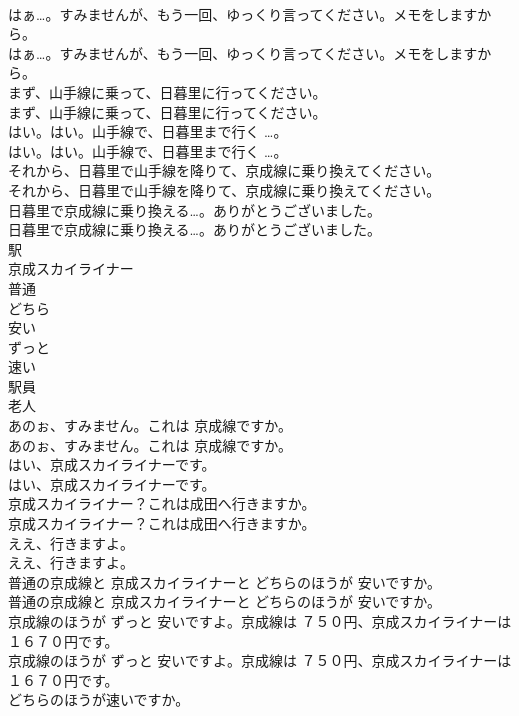 \documentclass[8pt]{extreport}
\begin{document}
\begin{CJK}{UTF8}{min}
\\	はぁ…。すみませんが、もう一回、ゆっくり言ってください。メモをしますから。	
\\	はぁ…。すみませんが、もう一回、ゆっくり言ってください。メモをしますから。 
\\	まず、山手線に乗って、日暮里に行ってください。	
\\	まず、山手線に乗って、日暮里に行ってください。 
\\	はい。はい。山手線で、日暮里まで行く …。	
\\	はい。はい。山手線で、日暮里まで行く …。 
\\	それから、日暮里で山手線を降りて、京成線に乗り換えてください。	
\\	それから、日暮里で山手線を降りて、京成線に乗り換えてください。 
\\	日暮里で京成線に乗り換える…。ありがとうございました。	
\\	日暮里で京成線に乗り換える…。ありがとうございました。 
\\	駅
\\	京成スカイライナー
\\	普通
\\	どちら
\\	安い
\\	ずっと
\\	速い
\\	駅員
\\	老人
\\	あのぉ、すみません。これは 京成線ですか。	
\\	あのぉ、すみません。これは 京成線ですか。 
\\	はい、京成スカイライナーです。	
\\	はい、京成スカイライナーです。 
\\	京成スカイライナー？これは成田へ行きますか。	
\\	京成スカイライナー？これは成田へ行きますか。 
\\	ええ、行きますよ。	
\\	ええ、行きますよ。 
\\	普通の京成線と 京成スカイライナーと どちらのほうが 安いですか。	
\\	普通の京成線と 京成スカイライナーと どちらのほうが 安いですか。 
\\	京成線のほうが ずっと 安いですよ。京成線は ７５０円、京成スカイライナーは １６７０円です。	
\\	京成線のほうが ずっと 安いですよ。京成線は ７５０円、京成スカイライナーは １６７０円です。 
\\	どちらのほうが速いですか。	

\end{CJK}
\end{document}
